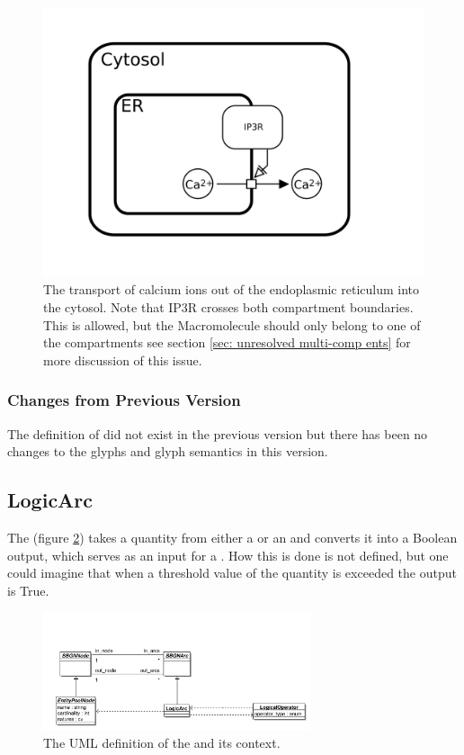 \begin{figure}[H]
  \centering
  \includegraphics[scale = 0.3]{examples/necessary_stim-transport}
  \caption{The transport of calcium ions out of the endoplasmic
    reticulum into the cytosol. Note that IP3R crosses both
    compartment boundaries. This is allowed, but the Macromolecule
    should only belong to one of the compartments see section
    \ref{sec: unresolved multi-comp ents} for more discussion of this
    issue.}
  \label{fig:necessary_stim-calcium}
\end{figure}

\subsubsection{Changes from Previous Version}

The definition of  did not exist in the
previous version but there has been no changes to the glyphs and glyph
semantics in this version.

\subsection{LogicArc}
\label{defn:LogicArc}

The  (figure \ref{fig:logicarcuml}) takes a quantity from either a
 or an  and
converts it into a Boolean output, which serves as an input for a
. How this is done is not defined, but one
could imagine that when a threshold value of the quantity is exceeded
the output is True.

\begin{figure}[htb]
  \centering
  \includegraphics[width = 0.7\textwidth]{images/logicarcuml}
  \caption{The UML definition of the  and its context.}
  \label{fig:logicarcuml}
\end{figure}

